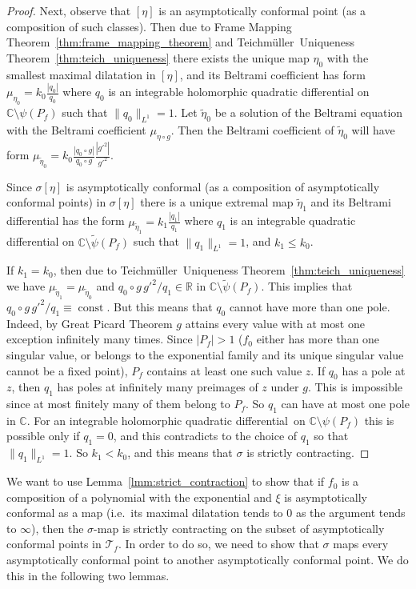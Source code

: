 \documentclass[10pt,reqno,a4paper]{amsart}
\numberwithin{figure}{section}
\numberwithin{equation}{section}
\newcommand{\tei}{Teichm\"uller}
\newcommand{\qd}{quadratic differential}
\newcommand{\const}{\operatorname{const}}
\newcommand{\abs}[1]{\lvert #1 \rvert}
\begin{document}
\begin{proof}
	Next, observe that $ [\eta] $ is an asymptotically conformal point (as a composition of such classes). Then due to Frame Mapping Theorem~\ref{thm:frame_mapping_theorem} and \tei\ Uniqueness Theorem~\ref{thm:teich_uniqueness} there exists the unique map $\eta_0$ with the smallest maximal dilatation in $ [\eta] $, and its Beltrami coefficient has form $ \mu_{\eta_0}=k_0 \frac{|q_0|}{q_0} $ where $ q_0 $ is an integrable holomorphic quadratic differential on $ \mathbb{C}\setminus\psi(P_f) $ such that $\|q_0\|_{L^1}=1$. Let $ \tilde{\eta}_0 $ be a solution of the Beltrami equation with the Beltrami coefficient $\mu_{\eta\circ g}$. Then the Beltrami coefficient of $ \tilde{\eta}_0 $ will have form $ \mu_{\tilde{\eta}_0}=k_0 \frac{|q_0\circ g|}{q_0\circ g }\frac{|g'^2|}{g'^2} $.
	
	Since $\sigma[\eta]$ is asymptotically conformal (as a composition of asymptotically conformal points) in $ \sigma[\eta] $ there is a unique extremal map $ \tilde{\eta}_1 $ 
	and its Beltrami differential has the form $ \mu_{\tilde{\eta}_1}=k_1 \frac{|q_1|}{q_1}$ where $ q_1 $ is an integrable quadratic differential on $\mathbb{C}\setminus\tilde{\psi}(P_f)$ such that $\|q_1\|_{L^1}=1$, and $k_1\leq k_0$.
	
	If $ k_1=k_0 $, then due to \tei\ Uniqueness Theorem~\ref{thm:teich_uniqueness} we have $\mu_{\tilde{\eta}_1}=\mu_{\tilde{\eta}_0} $ and $ q_0\circ g \, g'^2/q_1\in\mathbb{R} $ in $\mathbb{C}\setminus \tilde{\psi}(P_f)$. This implies that $q_0\circ g\,g'^2/q_1\equiv\const$. But this means that $q_0$ cannot have more than one pole. Indeed, by Great Picard Theorem $g$ attains every value with at most one exception infinitely many times. Since $\abs{P_f}>1$ ($f_0$ either has more than one singular value, or belongs to the exponential family and its unique singular value cannot be a fixed point), $P_f$ contains at least one such value $z$. If $q_0$ has a pole at $z$, then $q_1$ has poles at infinitely many preimages of $z$ under $g$. This is impossible since at most finitely many of them belong to $P_f$. So $q_1$ can have at most one pole in $\mathbb{C}$. For an integrable holomorphic \qd\ on $\mathbb{C}\setminus\psi(P_f)$ this is possible only if $q_1=0$, and this contradicts to the choice of $q_1$ so that $\|q_1\|_{L^1}=1$. So $ k_1<k_0 $, and this means that $ \sigma $ is strictly contracting.		
\end{proof}

We want to use Lemma~\ref{lmm:strict_contraction} to show that if $f_0$ is a composition of a polynomial with the exponential and $\xi$ is asymptotically conformal as a map (i.e.\ its maximal dilatation tends to $0$ as the argument tends to $\infty$), then the $\sigma$-map is strictly contracting on the subset of asymptotically conformal points in $\mathcal{T}_f$. In order to do so, we need to show that $\sigma$ maps every asymptotically conformal point to another asymptotically conformal point. We do this in the following two lemmas.
\end{document}
